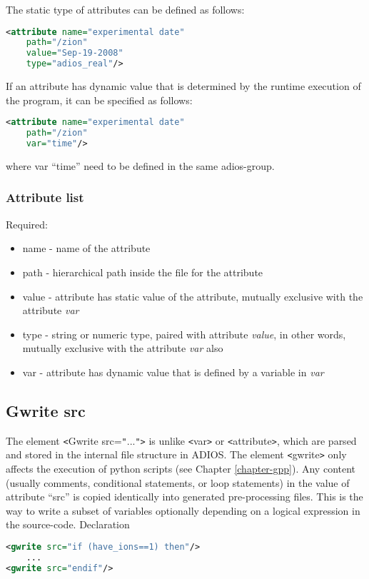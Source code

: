 The static type of attributes can be defined as follows:
\begin{lstlisting}[language=XML]
<attribute name="experimental date"
    path="/zion"
    value="Sep-19-2008" 
    type="adios_real"/>
\end{lstlisting}

If an attribute has dynamic value that is determined by the runtime execution of 
the program, it can be specified as follows:
\begin{lstlisting}[language=XML]
<attribute name="experimental date"
    path="/zion"
    var="time"/>
\end{lstlisting}
where var ``time'' need to be defined in the same adios-group.

\subsubsection{Attribute list}

Required:
\begin{itemize}
\item name -  name of the attribute
\item path - hierarchical path inside the file for the attribute
\item value - attribute has static value of the attribute, mutually exclusive with the  attribute \textit{var}
\item type - string or numeric type, paired with attribute \textit{value}, in other words, mutually exclusive with the attribute \textit{var} also
\item var - attribute has dynamic value that is defined by a variable in \textit{var}
\end{itemize}

\subsection{Gwrite src}

The element \texttt{<}Gwrite src=\texttt{"}...\texttt{"}\texttt{>} is unlike \texttt{<}var\texttt{>} 
or \texttt{<}attribute\texttt{>}, which are parsed and stored in the internal file 
structure in ADIOS. The element \texttt{<}gwrite\texttt{>} only affects the execution 
of python scripts (see Chapter \ref{chapter-gpp}). 
Any content (usually comments, conditional statements, 
or loop statements) in the value of attribute ``src'' is copied identically into 
generated pre-processing files. This is the way to write a subset of variables optionally
depending on a logical expression in the source-code. Declaration
\begin{lstlisting}[language=XML]
<gwrite src="if (have_ions==1) then"/>
    ...
<gwrite src="endif"/>
\end{lstlisting}

